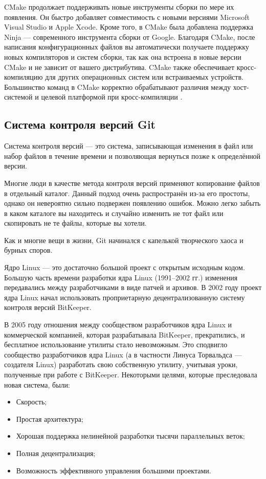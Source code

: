 CMake продолжает поддерживать новые инструменты сборки по мере их появления. Он быстро добавляет совместимость с новыми версиями Microsoft Visual Studio и Apple Xcode. Кроме того, в CMake была добавлена поддержка Ninja — современного инструмента сборки от Google. Благодаря CMake, после написания конфигурационных файлов вы автоматически получаете поддержку новых компиляторов и систем сборки, так как она встроена в новые версии CMake и не зависит от вашего дистрибутива. CMake также обеспечивает кросс-компиляцию для других операционных систем или встраиваемых устройств. Большинство команд в CMake корректно обрабатывают различия между хост-системой и целевой платформой при кросс-компиляции \cite{CMake}.

\subsection{Система контроля версий Git}

Система контроля версий — это система, записывающая изменения в файл или набор файлов в течение времени и позволяющая вернуться позже к определённой версии.

Многие люди в качестве метода контроля версий применяют копирование файлов в
отдельный каталог. Данный подход очень распространён из-за его простоты, однако он
невероятно сильно подвержен появлению ошибок. Можно легко забыть в каком каталоге
вы находитесь и случайно изменить не тот файл или скопировать не те файлы, которые вы
хотели.

Как и многие вещи в жизни, Git начинался с капелькой творческого хаоса и бурных споров.

Ядро Linux — это достаточно большой проект с открытым исходным кодом. Большую часть
времени разработки ядра Linux (1991–2002 гг.) изменения передавались между
разработчиками в виде патчей и архивов. В 2002 году проект ядра Linux начал использовать
проприетарную децентрализованную систему контроля версий BitKeeper.

В 2005 году отношения между сообществом разработчиков ядра Linux и коммерческой
компанией, которая разрабатывала BitKeeper, прекратились, и бесплатное использование
утилиты стало невозможным. Это сподвигло сообщество разработчиков ядра Linux (а в
частности Линуса Торвальдса — создателя Linux) разработать свою собственную утилиту,
учитывая уроки, полученные при работе с BitKeeper. Некоторыми целями, которые
преследовала новая система, были:
\begin{itemize}
	\item Скорость;
	\item Простая архитектура;
	\item Хорошая поддержка нелинейной разработки тысячи параллельных веток;
	\item Полная децентрализация;
	\item Возможность эффективного управления большими проектами.
\end{itemize}

